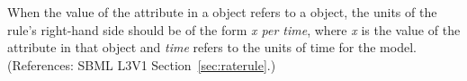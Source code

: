 When the value of the attribute  in a \RateRule object
refers to a \Parameter object, the units of the rule's right-hand side
should be of the form \emph{x per time}, where \emph{x} is the value of the
 attribute in that \Parameter object and \emph{time} refers to
the units of time for the model.  (References: SBML L3V1
Section~\ref{sec:raterule}.)

